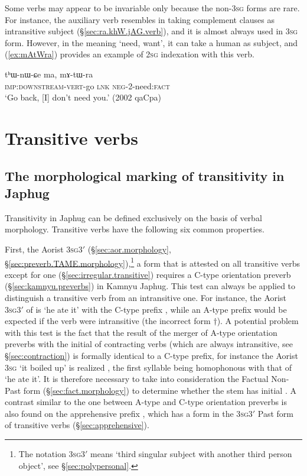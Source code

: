 Some verbs may appear to be invariable only because the non-\textsc{3sg} forms are rare. For instance, the auxiliary verb  resembles  in taking complement clauses as intransitive subject (§\ref{sec:ra.khW.jAG.verb}), and it is almost always used in \textsc{3sg} form. However, in the meaning `need, want', it can take a human as subject, and (\ref{ex:mAtWra}) provides an example of \textsc{2sg} indexation with this verb.

\begin{exe}
\ex   \label{ex:mAtWra}
\gll  tʰɯ-nɯ-ɕe ma, mɤ-tɯ-ra \\
\textsc{imp}:\textsc{downstream}-\textsc{vert}-go \textsc{lnk} \textsc{neg}-2-need:\textsc{fact} \\
\glt `Go back, [I] don't need you.' (2002 qaCpa)
\end{exe}

\section{Transitive verbs} \label{sec:tr.indexation}
\subsection{The morphological marking of transitivity in Japhug} \label{sec:transitivity.morphology}
   
Transitivity in Japhug can be defined exclusively on the basis of verbal morphology. Transitive verbs have the following six common properties.

First, the Aorist 3\textsc{sg}\fl{}3$'$ (§\ref{sec:aor.morphology}, §\ref{sec:preverb.TAME.morphology}),\footnote{The notation 3\textsc{sg}\fl{}3$'$ means `third singular subject with another third person object', see §\ref{sec:polypersonal}. } a form that is attested on all transitive verbs except for one (§\ref{sec:irregular.transitive}) requires a C-type orientation preverb (§\ref{sec:kamnyu.preverbs}) in Kamnyu Japhug. This test can always be applied to distinguish a transitive verb from an intransitive one. For instance, the Aorist 3\textsc{sg}\fl{}3$'$ of  is  `he ate it' with the C-type prefix , while an A-type prefix  would be expected if the verb were intransitive (the incorrect form $\dagger$). A potential problem with this test is the fact that the result of the merger of A-type orientation preverbs with the initial  of contracting verbs (which are always intransitive, see §\ref{sec:contraction}) is formally identical to a C-type prefix, for instance the Aorist \textsc{3sg}  `it boiled up' is realized , the first syllable  being homophonous with that of  `he ate it'. It is therefore necessary to take into consideration the Factual Non-Past form (§\ref{sec:fact.morphology}) to determine whether the stem has initial . A contrast similar to the one between A-type and C-type orientation preverbs is also found on the apprehensive prefix , which has a form  in the 3\textsc{sg}\fl{}3$'$ Past form of transitive verbs (§\ref{sec:apprehensive}).


